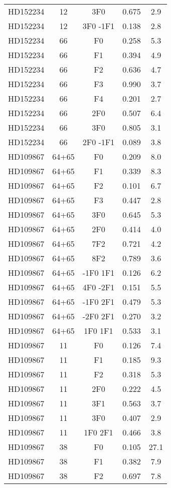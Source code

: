 \begin{table*}
\begin{tabular}{l c c c c}
HD152234 & 12 & 3F0 & 0.675 & 2.9\\ 
HD152234 & 12 & 3F0 -1F1 & 0.138 & 2.8\\ 
\hline
HD152234 & 66 & F0 & 0.258 & 5.3\\ 
HD152234 & 66 & F1 & 0.394 & 4.9\\ 
HD152234 & 66 & F2 & 0.636 & 4.7\\ 
HD152234 & 66 & F3 & 0.990 & 3.7\\ 
HD152234 & 66 & F4 & 0.201 & 2.7\\ 
HD152234 & 66 & 2F0 & 0.507 & 6.4\\ 
HD152234 & 66 & 3F0 & 0.805 & 3.1\\ 
HD152234 & 66 & 2F0 -1F1 & 0.089 & 3.8\\ 
\hline
HD109867 & 64+65 & F0 & 0.209 & 8.0\\ 
HD109867 & 64+65 & F1 & 0.339 & 8.3\\ 
HD109867 & 64+65 & F2 & 0.101 & 6.7\\ 
HD109867 & 64+65 & F3 & 0.447 & 2.8\\ 
HD109867 & 64+65 & 3F0 & 0.645 & 5.3\\ 
HD109867 & 64+65 & 2F0 & 0.414 & 4.0\\ 
HD109867 & 64+65 & 7F2 & 0.721 & 4.2\\ 
HD109867 & 64+65 & 8F2 & 0.789 & 3.6\\ 
HD109867 & 64+65 & -1F0 1F1 & 0.126 & 6.2\\ 
HD109867 & 64+65 & 4F0 -2F1 & 0.151 & 5.5\\ 
HD109867 & 64+65 & -1F0 2F1 & 0.479 & 5.3\\ 
HD109867 & 64+65 & -2F0 2F1 & 0.270 & 3.2\\ 
HD109867 & 64+65 & 1F0 1F1 & 0.533 & 3.1\\ 
\hline
HD109867 & 11 & F0 & 0.126 & 7.4\\ 
HD109867 & 11 & F1 & 0.185 & 9.3\\ 
HD109867 & 11 & F2 & 0.318 & 5.3\\ 
HD109867 & 11 & 2F0 & 0.222 & 4.5\\ 
HD109867 & 11 & 3F1 & 0.563 & 3.7\\ 
HD109867 & 11 & 3F0 & 0.407 & 2.9\\ 
HD109867 & 11 & 1F0 2F1 & 0.466 & 3.8\\ 
\hline
HD109867 & 38 & F0 & 0.105 & 27.1\\ 
HD109867 & 38 & F1 & 0.382 & 7.9\\ 
HD109867 & 38 & F2 & 0.697 & 7.8\\ 

\end{tabular}
\end{table*}
